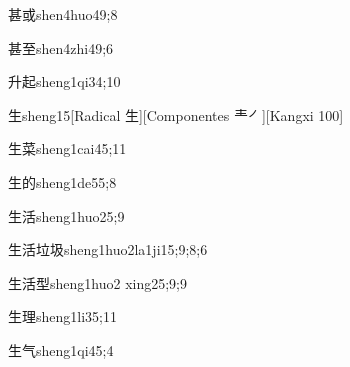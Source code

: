 \begin{verbete}{甚或}{shen4huo4}{9;8}
\end{verbete}

\begin{verbete}{甚至}{shen4zhi4}{9;6}
\end{verbete}

\begin{verbete}{升起}{sheng1qi3}{4;10}
\end{verbete}

\begin{verbete}{生}{sheng1}{5}[Radical 生][Componentes 龶㇒][Kangxi 100]
\end{verbete}

\begin{verbete}{生菜}{sheng1cai4}{5;11}
\end{verbete}

\begin{verbete}{生的}{sheng1de5}{5;8}
\end{verbete}

\begin{verbete}{生活}{sheng1huo2}{5;9}
\end{verbete}

\begin{verbete}{生活垃圾}{sheng1huo2la1ji1}{5;9;8;6}
\end{verbete}

\begin{verbete}{生活型}{sheng1huo2 xing2}{5;9;9}
\end{verbete}

\begin{verbete}{生理}{sheng1li3}{5;11}
\end{verbete}

\begin{verbete}{生气}{sheng1qi4}{5;4}
\end{verbete}

